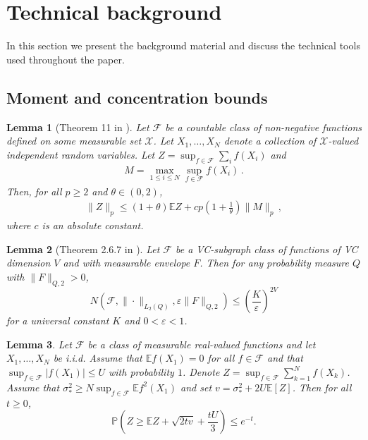 \documentclass[12pt]{article}
\def\l{\left}
\def\r{\right}
\newcommand{\m}{\mathcal}
\newcommand{\mb}{\mathbb}
\newtheorem{lemma}{Lemma}
\theoremstyle{thmstyletwo}%
\theoremstyle{thmstylethree}%
\begin{document}
\appendix


\section{Technical background}
\label{appendix:backgrond}

In this section we present the background material and discuss the technical tools used throughout the paper. 

\subsection{Moment and concentration bounds}
\label{section:tech}

\begin{lemma}[Theorem 11 in \citep{boucheron2005moment}]
\label{lemma:sup-rosenthal}
    Let $\mathcal{F}$ be a countable class of non-negative functions defined on some measurable set $\mathcal{X}$. Let $X_1, \ldots, X_N$ denote  a collection of $\mathcal{X}$-valued independent random variables. Let $Z = \sup_{f \in \mathcal{F}}\sum_i f(X_i)$ and
    \begin{align*}
        M = \max_{1 \leq i \leq N} \sup_{f \in \mathcal{F}} f(X_i)\,.
    \end{align*}
    Then, for all $p \geq 2$ and $\theta \in (0, 2)$,
    \begin{align*}
        \|Z\|_p \leq (1 + \theta)\mb E Z + cp\l(1 + \frac{1}{\theta}\r)\|M\|_p\,,
    \end{align*}
    where $c$ is an absolute constant.
\end{lemma}


\begin{lemma}[Theorem 2.6.7 in \citep{wellner2013weak}]
\label{lemma:covering_bound}
Let $\mathcal{F}$ be a VC-subgraph class of functions of VC dimension $V$ and with measurable envelope $F$. Then for any probability measure $Q$ with $\|F\|_{Q,2}>0$,
\begin{equation*}
N\l(\mathcal{F}, \|\cdot\|_{L_2(Q)},\varepsilon\|F\|_{Q,2}\r)\leq \l(\frac{K}{\varepsilon}\r)^{2V}
\end{equation*}
for a universal constant $K$ and $0<\varepsilon<1$.
\end{lemma}


\begin{lemma} 
\label{lemma:talagrand-bousquet} 
\cite[Theorem 12.5]{boucheron2013concentration}
Let $\m F$ be a class of measurable real-valued functions and let $X_1,\ldots,X_N$ be i.i.d. Assume that $\mb{E}f(X_1)=0$ for all $f\in \m F$ and that $\sup_{f\in \m F} |f(X_1)|\leq U$ with probability $1$. Denote $Z=\sup _{f \in \mathcal{F}} \sum_{k=1}^N f\left(X_k\right)$.
Assume that $\sigma_\ast^2\geq N\sup_{f\in \m F} \mb{E}f^2(X_1)$ and set $v = \sigma_\ast^2 + 2U\mb{E}[Z]$. Then for all $t\geq 0$, 
\begin{equation}
\label{eq:bousquet}
    \mb{P}\left(Z \geq \mb{E} Z + \sqrt{2 t v}+\frac{tU}{3}\right) \leq e^{-t}.
\end{equation}
\end{lemma}
\end{document}
